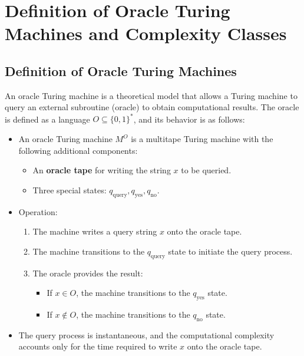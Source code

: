 \documentclass[a4paper]{article}
\begin{document}
\section*{Definition of Oracle Turing Machines and Complexity Classes}

\subsection*{Definition of Oracle Turing Machines}
An oracle Turing machine is a theoretical model that allows a Turing machine to query an external subroutine (oracle) to obtain computational results. The oracle is defined as a language $O \subseteq \{0, 1\}^*$, and its behavior is as follows:

\begin{itemize}
    \item An oracle Turing machine $M^O$ is a multitape Turing machine with the following additional components:
    \begin{itemize}
        \item An \textbf{oracle tape} for writing the string $x$ to be queried.
        \item Three special states: $q_{\text{query}}, q_{\text{yes}}, q_{\text{no}}$.
    \end{itemize}
    \item Operation:
    \begin{enumerate}
        \item The machine writes a query string $x$ onto the oracle tape.
        \item The machine transitions to the $q_{\text{query}}$ state to initiate the query process.
        \item The oracle provides the result:
        \begin{itemize}
            \item If $x \in O$, the machine transitions to the $q_{\text{yes}}$ state.
            \item If $x \notin O$, the machine transitions to the $q_{\text{no}}$ state.
        \end{itemize}
    \end{enumerate}
    \item The query process is instantaneous, and the computational complexity accounts only for the time required to write $x$ onto the oracle tape.
\end{itemize}
\end{document}
